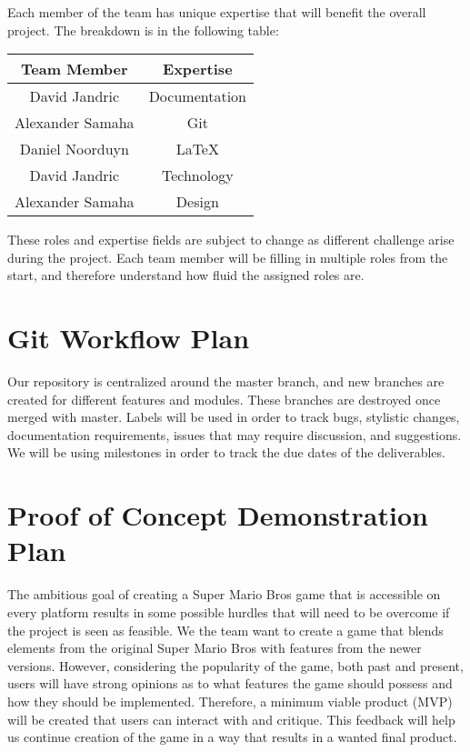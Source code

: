 \documentclass{article}
\begin{document}
Each member of the team has unique expertise that will benefit the overall
project. The breakdown is in the following table:

\begin{center}
  \begin{tabular}{ |c|c| }
    \hline
    Team Member & Expertise\\
    \hline
     David Jandric & Documentation\\
     Alexander Samaha & Git\\
     Daniel Noorduyn & LaTeX\\
     David Jandric & Technology\\
     Alexander Samaha & Design\\
    \hline
  \end{tabular}
\end{center}

These roles and expertise fields are subject to change as different challenge
arise during the project. Each team member will be filling in multiple roles
from the start, and therefore understand how fluid the assigned roles are.

\section{Git Workflow Plan}

Our repository is centralized around the master branch, and new branches are
created for different features and modules. These branches are destroyed once 
merged with master. Labels will be used in order to track bugs, stylistic 
changes, documentation requirements, issues that may require discussion, and 
suggestions. We will be using milestones in order to track the due dates 
of the deliverables.

\section{Proof of Concept Demonstration Plan}

The ambitious goal of creating a Super Mario Bros game that is accessible on
every platform results in some possible hurdles that will need to be overcome if
the project is seen as feasible. We the team want to create a game that blends
elements from the original Super Mario Bros with features from the newer
versions. However, considering the popularity of the game, both past and
present, users will have strong opinions as to what features the game should
possess and how they should be implemented. Therefore, a minimum viable product
(MVP) will be created that users can interact with and critique. This feedback
will help us continue creation of the game in a way that results in a wanted
final product.
\end{document}
